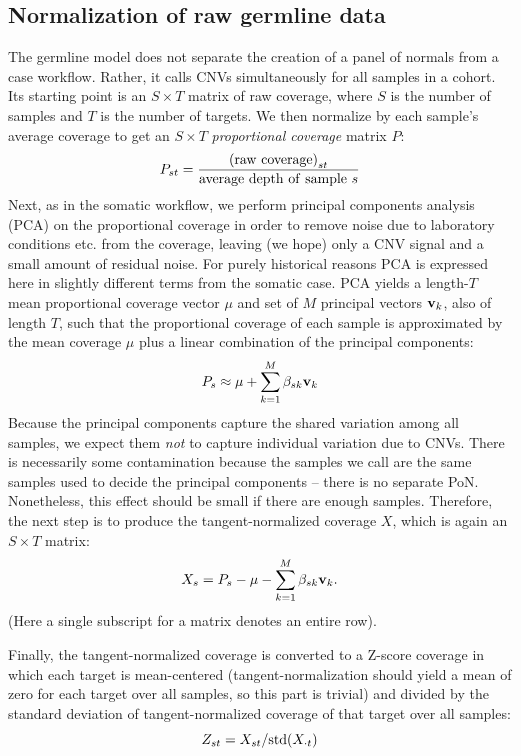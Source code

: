 \documentclass[nofootinbib,amssymb,amsmath]{revtex4}
\begin{document}
\subsection{Normalization of raw germline data} \label{germline-normalization}
The germline model does not separate the creation of a panel of normals from a case workflow.  Rather, it calls CNVs simultaneously for all samples in a cohort.  Its starting point is an $S \times T$ matrix of raw coverage, where $S$ is the number of samples and $T$ is the number of targets.  We then normalize by each sample's average coverage to get an $S \times T$ \textit{proportional coverage} matrix $P$:
%
\begin{equation}
P_{st} = \frac{ \left( {\rm raw~coverage} \right)_{st} } { {\rm average~depth~of~sample~}s}
\end{equation}
%
Next, as in the somatic workflow, we perform principal components analysis (PCA) on the proportional coverage in order to remove noise due to laboratory conditions etc. from the coverage, leaving (we hope) only a CNV signal and a small amount of residual noise.  For purely historical reasons PCA is expressed here in slightly different terms from the somatic case.  PCA yields a length-$T$ mean proportional coverage vector $\mu$ and set of $M$ principal vectors ${\bf v}_k$, also of length $T$, such that the proportional coverage of each sample is approximated by the mean coverage $\mu$ plus a linear combination of the principal components:
%
\begin{equation}
P_s \approx \mu + \sum_{k=1}^M \beta_{sk} {\bf v}_k
\end{equation}
%
Because the principal components capture the shared variation among all samples, we expect them \textit{not} to capture individual variation due to CNVs.  There is necessarily some contamination because the samples we call are the same samples used to decide the principal components -- there is no separate PoN.  Nonetheless, this effect should be small if there are enough samples.  Therefore, the next step is to produce the tangent-normalized coverage $X$, which is again an $S \times T$ matrix:
%
\begin{equation}
X_s = P_s - \mu -  \sum_{k=1}^M \beta_{sk} {\bf v}_k.
\end{equation}
%
(Here a single subscript for a matrix denotes an entire row).

Finally, the tangent-normalized coverage is converted to a Z-score coverage in which each target is mean-centered (tangent-normalization should yield a mean of zero for each target over all samples, so this part is trivial) and divided by the standard deviation of tangent-normalized coverage of that target over all samples:
%
\begin{equation}
Z_{st} = X_{st} / {\rm std}(X_{\cdot t})
\end{equation}
%
\end{document}
